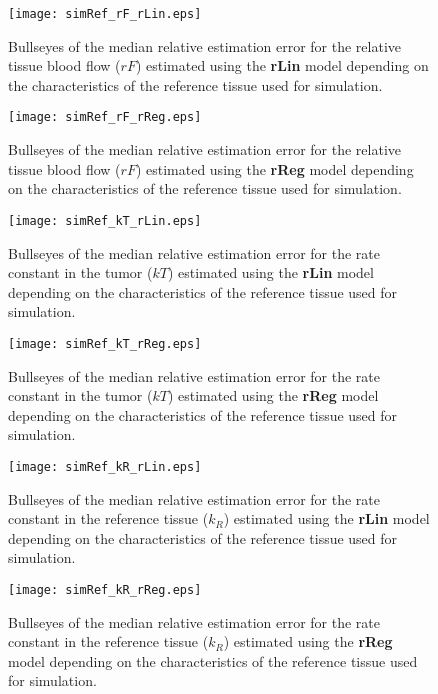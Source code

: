 \begin{figure}
\texttt{[image: simRef\_rF\_rLin.eps]}
\caption{Bullseyes of the median relative estimation error for the relative tissue blood flow ($rF$) estimated using the \textbf{rLin} model depending on the characteristics of the reference tissue used for simulation.}
\label{fig:referenceTissue_rF_rLin}
\end{figure}

\begin{figure}
\texttt{[image: simRef\_rF\_rReg.eps]}
\caption{Bullseyes of the median relative estimation error for the relative tissue blood flow ($rF$) estimated using the \textbf{rReg} model depending on the characteristics of the reference tissue used for simulation.}
\label{fig:referenceTissue_rF_rReg}
\end{figure}

\begin{figure}
\texttt{[image: simRef\_kT\_rLin.eps]}
\caption{Bullseyes of the median relative estimation error for the rate constant in the tumor ($kT$) estimated using the \textbf{rLin} model depending on the characteristics of the reference tissue used for simulation.}
\label{fig:referenceTissue_kT_rLin}
\end{figure}

\begin{figure}
\texttt{[image: simRef\_kT\_rReg.eps]}
\caption{Bullseyes of the median relative estimation error for the rate constant in the tumor ($kT$) estimated using the \textbf{rReg} model depending on the characteristics of the reference tissue used for simulation.}
\label{fig:referenceTissue_kT_rReg}
\end{figure}

\begin{figure}
\texttt{[image: simRef\_kR\_rLin.eps]}
\caption{Bullseyes of the median relative estimation error for the rate constant in the reference tissue ($k_R$) estimated using the \textbf{rLin} model depending on the characteristics of the reference tissue used for simulation.}
\label{fig:referenceTissue_kR_rLin}
\end{figure}

\begin{figure}
\texttt{[image: simRef\_kR\_rReg.eps]}
\caption{Bullseyes of the median relative estimation error for the rate constant in the reference tissue ($k_R$) estimated using the \textbf{rReg} model depending on the characteristics of the reference tissue used for simulation.}
\label{fig:referenceTissue_kR_rReg}
\end{figure}


